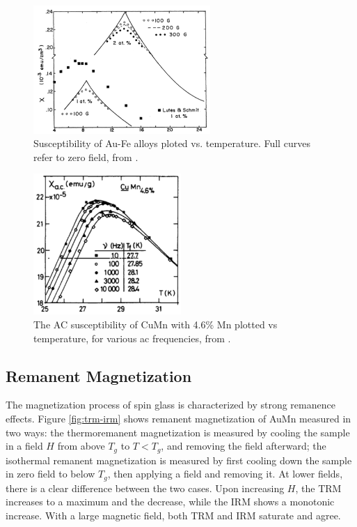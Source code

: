 \begin{figure}
  \centering
  \includegraphics[width=0.6\textwidth]{img/cusp.png}
  \caption{\label{fig:au-fe-cusp}Susceptibility of Au-Fe alloys ploted vs. temperature. Full curves refer to zero field, from \citet{PhysRevB.6.4220}.}
\end{figure}
\begin{figure}
  \centering
  \includegraphics[width=0.5\textwidth]{img/ac-chi-freq.png}
  \caption{\label{fig:ac-chi-freq}The AC susceptibility of CuMn with 4.6\% Mn plotted vs temperature, for various ac frequencies, from \citet{THOLENCE1980113}.}
\end{figure}


\subsection{Remanent Magnetization}
The magnetization process of spin glass is characterized by strong remanence effects.
Figure \ref{fig:trm-irm} shows remanent magnetization of AuMn measured in two ways:
the thermoremanent magnetization is measured by cooling the sample in a field $H$ 
from above $T_g$ to $T<T_g$, and removing the field afterward; the isothermal 
remanent magnetization is measured by first cooling down the sample in zero field to
below $T_g$, then applying a field and removing it. At lower fields, there is a 
clear difference between the two cases. Upon increasing $H$, the TRM increases to 
a maximum and the decrease, while the IRM shows a monotonic increase. With a large
magnetic field, both TRM and IRM saturate and agree. 



